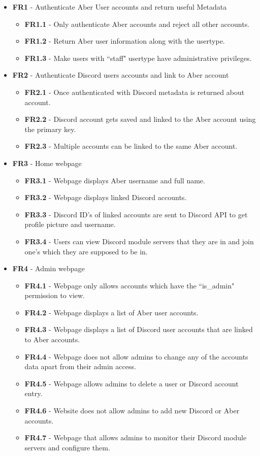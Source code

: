 \begin{itemize}
	\item \textbf{FR1} - Authenticate Aber User accounts and return useful Metadata
	\begin{itemize}
		\item \textbf{FR1.1} - Only authenticate Aber accounts and reject all other accounts.
		\item \textbf{FR1.2} - Return Aber user information along with the usertype.
		\item \textbf{FR1.3} - Make users with ``staff" usertype have administrative privileges.
	\end{itemize}

	\item \textbf{FR2} - Authenticate Discord users accounts and link to Aber account
	\begin{itemize}
		\item \textbf{FR2.1} - Once authenticated with Discord metadata is returned about account.
		\item \textbf{FR2.2} - Discord account gets saved and linked to the Aber account using the primary key.
		\item \textbf{FR2.3} - Multiple accounts can be linked to the same Aber account.
	\end{itemize}

	\item \textbf{FR3} - Home webpage
	\begin{itemize}
		\item \textbf{FR3.1} - Webpage displays Aber username and full name.
		\item \textbf{FR3.2} - Webpage displays linked Discord accounts.
		\item \textbf{FR3.3} - Discord ID's of linked accounts are sent to Discord API to get profile picture and username.
		\item \textbf{FR3.4} - Users can view Discord module servers that they are in and join one's which they are supposed to be in.
	\end{itemize}

	\item \textbf{FR4} - Admin webpage
	\begin{itemize}
		\item \textbf{FR4.1} - Webpage only allows accounts which have the ``is\_admin" permission to view.
		\item \textbf{FR4.2} - Webpage displays a list of Aber user accounts.
		\item \textbf{FR4.3} - Webpage displays a list of Discord user accounts that are linked to Aber accounts.
		\item \textbf{FR4.4} - Webpage does not allow admins to change any of the accounts data apart from their admin access.
		\item \textbf{FR4.5} - Webpage allows admins to delete a user or Discord account entry.
		\item \textbf{FR4.6} - Website does not allow admins to add new Discord or Aber accounts.
		\item \textbf{FR4.7} - Webpage that allows admins to monitor their Discord module servers and configure them.
	\end{itemize}


\end{itemize}
